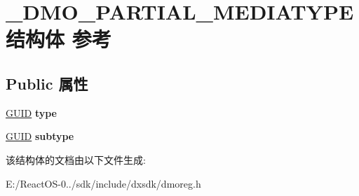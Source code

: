 \hypertarget{struct___d_m_o___p_a_r_t_i_a_l___m_e_d_i_a_t_y_p_e}{}\section{\+\_\+\+D\+M\+O\+\_\+\+P\+A\+R\+T\+I\+A\+L\+\_\+\+M\+E\+D\+I\+A\+T\+Y\+P\+E结构体 参考}
\label{struct___d_m_o___p_a_r_t_i_a_l___m_e_d_i_a_t_y_p_e}
\subsection*{Public 属性}
\begin{DoxyCompactItemize}
\item 
\mbox{\label{struct___d_m_o___p_a_r_t_i_a_l___m_e_d_i_a_t_y_p_e_a5b0cbb169be44e3d0b09210d0647e28f}} 
\hyperlink{interface_g_u_i_d}{G\+U\+ID} {\bfseries type}
\item 
\mbox{\label{struct___d_m_o___p_a_r_t_i_a_l___m_e_d_i_a_t_y_p_e_af0dc4b0b3fbe87790b6a3d5941f005db}} 
\hyperlink{interface_g_u_i_d}{G\+U\+ID} {\bfseries subtype}
\end{DoxyCompactItemize}


该结构体的文档由以下文件生成\+:\begin{DoxyCompactItemize}
\item 
E\+:/\+React\+O\+S-\/0../sdk/include/dxsdk/dmoreg.\+h\end{DoxyCompactItemize}
